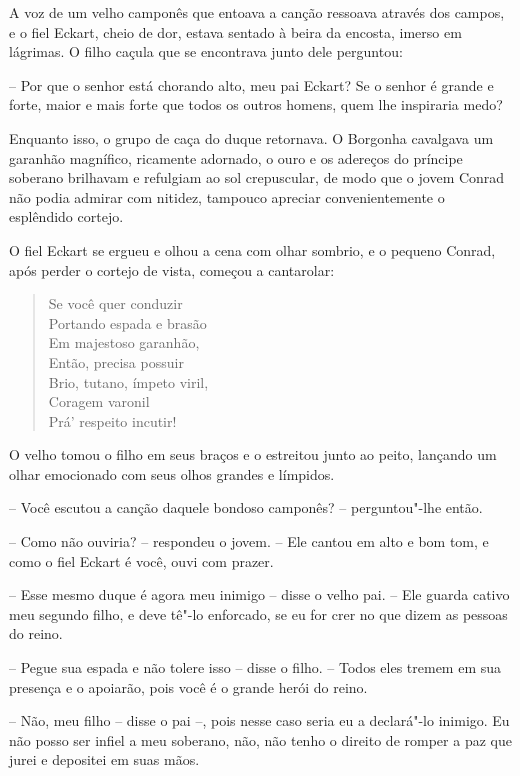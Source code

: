  A voz de um velho camponês que entoava a canção ressoava através dos
campos, e o fiel Eckart, cheio de dor, estava sentado à beira da
encosta, imerso em lágrimas. O filho caçula que se encontrava junto
dele perguntou: 

-- Por que o senhor está chorando alto, meu pai Eckart? Se
o senhor é grande e forte, maior e mais forte que todos os outros
homens, quem lhe inspiraria medo?

 Enquanto isso, o grupo de caça do duque retornava. O Borgonha cavalgava
um garanhão magnífico, ricamente adornado, o ouro e os adereços do
príncipe soberano brilhavam e refulgiam ao sol crepuscular, de modo que
o jovem Conrad não podia admirar com nitidez, tampouco apreciar
convenientemente o esplêndido cortejo.

 O fiel Eckart se ergueu e olhou a cena com olhar sombrio, e o pequeno
Conrad, após perder o cortejo de vista, começou a cantarolar:

\begin{verse}
Se você quer conduzir\\
Portando espada e brasão\\
Em majestoso garanhão,\\
Então, precisa possuir\\
Brio, tutano, ímpeto viril,\\
Coragem varonil\\
Prá' respeito incutir!
\end{verse}

 O velho tomou o filho em seus braços e o estreitou junto ao peito,
lançando um olhar emocionado com seus olhos grandes e límpidos. 

-- Você escutou a canção daquele bondoso camponês? -- perguntou"-lhe então.

 -- Como não ouviria? -- respondeu o jovem. -- Ele cantou em alto e bom tom, e
como o fiel Eckart é você, ouvi com prazer.

 -- Esse mesmo duque é agora meu inimigo -- disse o velho pai. -- Ele guarda
cativo meu segundo filho, e deve tê"-lo enforcado, se eu for crer no que
dizem as pessoas do reino. 

 -- Pegue sua espada e não tolere isso -- disse o filho. -- Todos eles tremem
em sua presença e o apoiarão, pois você é o grande herói do reino.

 -- Não, meu filho -- disse o pai --, pois nesse caso seria eu a declará"-lo
inimigo. Eu não posso ser infiel a meu soberano, não, não tenho o
direito de romper a paz que jurei e depositei em suas mãos. 

